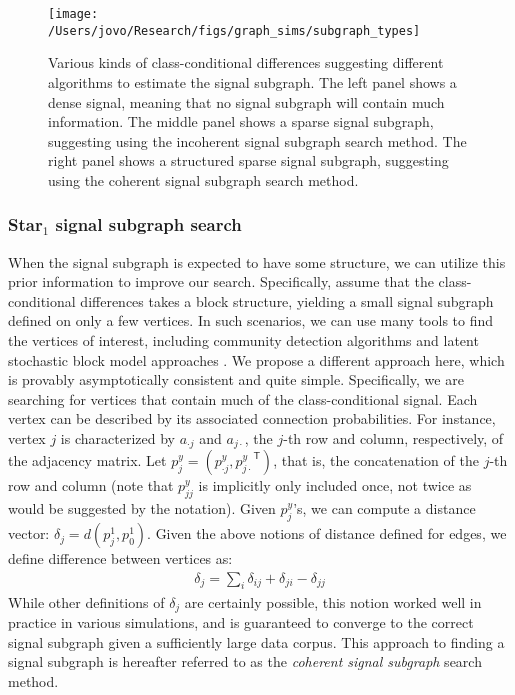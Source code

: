 \documentclass[10pt,journal,cspaper,compsoc]{IEEEtran}
\newcommand{\T}{^{\ensuremath{\mathsf{T}}}}           %
\begin{document}
\begin{figure}[h!]
\centering \texttt{[image: /Users/jovo/Research/figs/graph\_sims/subgraph\_types]}
\caption{Various kinds of class-conditional differences suggesting different algorithms to estimate the signal subgraph.  The left panel shows a dense signal, meaning that no signal subgraph will contain much information.  The middle panel shows a sparse signal subgraph, suggesting using the incoherent signal subgraph search method.  The right panel shows a structured sparse signal subgraph, suggesting using the coherent signal subgraph search method.}
\label{fig:subgraph_types}
\end{figure}



\subsubsection{Star$_1$ signal subgraph search} %
\label{sub:utilizing_graph_structure}

When the signal subgraph is expected to have some structure, we can utilize this prior information to improve our search.  Specifically, assume that the class-conditional differences takes a block structure, yielding a small signal subgraph defined on only a few vertices.  In such scenarios, we can use many tools to find the vertices of interest, including community detection algorithms \cite{Newman03} and latent stochastic block model approaches \cite{SnijdersNowicki97}.  We propose a different approach here, which is provably asymptotically consistent and quite simple.  Specifically, we are searching for vertices that contain much of the class-conditional signal.  Each vertex can be described by its associated connection probabilities.  For instance, vertex $j$ is characterized by $a_{\cdot j}$ and $a_{j \cdot}$, the $j$-th row and column, respectively, of the adjacency matrix.  Let $p^y_j=(p^y_{\cdot j}, {p^y_{j\cdot}}\T)$, that is, the concatenation of the $j$-th row and column (note that $p^y_{jj}$ is implicitly only included once, not twice as would be suggested by the notation).  Given $p^y_j$'s, we can compute a distance vector: $\delta_j = d(p^1_j, p^1_0)$.  Given the above notions of distance defined for edges, we define difference between vertices as:
\begin{align}
	\delta_j = \sum_i \delta_{ij} + \delta_{ji} - \delta_{jj}
\end{align}
While other definitions of $\delta_j$ are certainly possible, this notion worked well in practice in various simulations, and is guaranteed to converge to the correct signal subgraph given a sufficiently large data corpus. This approach to finding a signal subgraph is hereafter referred to as the \emph{coherent signal subgraph} search method.
\end{document}
